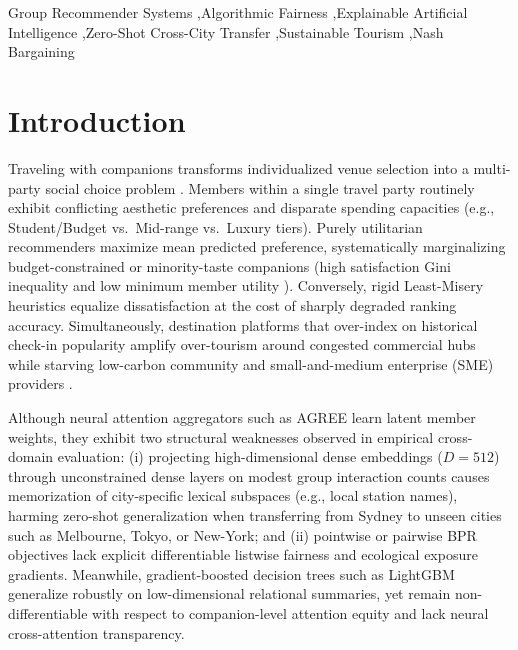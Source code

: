 \documentclass[preprint,12pt]{elsarticle}
\begin{document}
\begin{frontmatter}
\begin{abstract}
\end{abstract}

\begin{keyword}
Group Recommender Systems \sep Algorithmic Fairness \sep Explainable Artificial Intelligence \sep Zero-Shot Cross-City Transfer \sep Sustainable Tourism \sep Nash Bargaining
\end{keyword}
\end{frontmatter}

\section{Introduction}
Traveling with companions transforms individualized venue selection into a multi-party social choice problem \cite{masthoff2015group,cao2018attentive}. Members within a single travel party routinely exhibit conflicting aesthetic preferences and disparate spending capacities (e.g., Student/Budget vs.\ Mid-range vs.\ Luxury tiers). Purely utilitarian recommenders maximize mean predicted preference, systematically marginalizing budget-constrained or minority-taste companions (high satisfaction Gini inequality and low minimum member utility \cite{xiao2017fairness,kaya2020ensuring}). Conversely, rigid Least-Misery heuristics equalize dissatisfaction at the cost of sharply degraded ranking accuracy. Simultaneously, destination platforms that over-index on historical check-in popularity amplify over-tourism around congested commercial hubs while starving low-carbon community and small-and-medium enterprise (SME) providers \cite{burke2017multisided,patro2020fairrec}.

Although neural attention aggregators such as AGREE \cite{cao2018attentive} learn latent member weights, they exhibit two structural weaknesses observed in empirical cross-domain evaluation: (i) projecting high-dimensional dense embeddings ($D{=}512$) through unconstrained dense layers on modest group interaction counts causes memorization of city-specific lexical subspaces (e.g., local station names), harming zero-shot generalization when transferring from Sydney to unseen cities such as Melbourne, Tokyo, or New-York; and (ii) pointwise or pairwise BPR objectives lack explicit differentiable listwise fairness and ecological exposure gradients. Meanwhile, gradient-boosted decision trees such as LightGBM \cite{ke2017lightgbm} generalize robustly on low-dimensional relational summaries, yet remain non-differentiable with respect to companion-level attention equity and lack neural cross-attention transparency.
\end{document}

